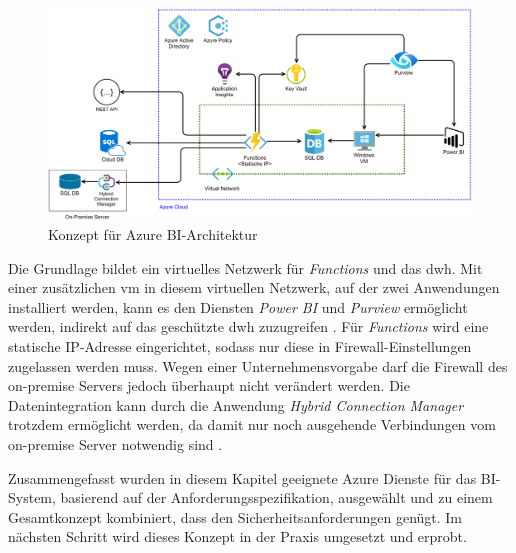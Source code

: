  \begin{figure}[htbp]
 \centering
 \includegraphics[width=\textwidth]{gfx/konzept_2.png}
 \caption{Konzept für Azure BI-Architektur}
\label{fig:chap03_4_konzeptArchitektur}
\end{figure}

Die Grundlage bildet ein virtuelles Netzwerk für \textit{Functions} und das \ac{dwh}. Mit einer zusätzlichen \ac{vm} in diesem virtuellen Netzwerk, auf der zwei Anwendungen installiert werden, kann es den Diensten \textit{Power BI} und \textit{Purview} ermöglicht werden, indirekt auf das geschützte \ac{dwh} zuzugreifen \cite[vgl.][]{gunnarsson_pro_2020, msdoc_22_purviewSHIR}. Für \textit{Functions} wird eine statische IP-Adresse eingerichtet, sodass nur diese in Firewall-Einstellungen zugelassen werden muss. Wegen einer Unternehmensvorgabe darf die Firewall des on-premise Servers jedoch überhaupt nicht verändert werden. Die Datenintegration kann durch die Anwendung \textit{Hybrid Connection Manager} trotzdem ermöglicht werden, da damit nur noch ausgehende Verbindungen vom on-premise Server notwendig sind \cite[vgl.][]{msdoc_22_func_hybridConn}.

Zusammengefasst wurden in diesem Kapitel geeignete Azure Dienste für das BI-System, basierend auf der Anforderungsspezifikation, ausgewählt und zu einem Gesamtkonzept kombiniert, dass den Sicherheitsanforderungen genügt. Im nächsten Schritt wird dieses Konzept in der Praxis umgesetzt und erprobt.